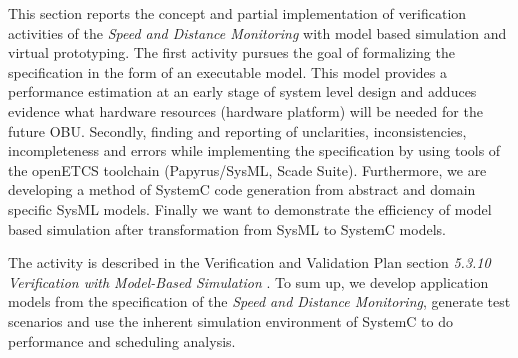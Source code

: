 %
%
%
%
%
%
%


\label{sec:urostock}
This section reports the concept and partial implementation of verification activities of the \emph{Speed and Distance Monitoring} with model based simulation and virtual prototyping. The first activity pursues the goal of formalizing the specification in the form of an executable model. This model provides a performance estimation at an early stage of system level design and adduces evidence what hardware resources (hardware platform) will be needed for the future OBU. Secondly, finding and reporting of unclarities, inconsistencies, incompleteness and errors while implementing the specification by using tools of the openETCS toolchain (Papyrus/SysML, Scade Suite). Furthermore, we are developing a method of SystemC code generation from abstract and domain specific SysML models. Finally we want to demonstrate the efficiency of model based simulation after transformation from SysML to SystemC models.

The activity is described in the Verification and Validation Plan section {\em 5.3.10 Verification with Model-Based Simulation} \cite{D4.1_2013}. To sum up, we develop application models from the specification of the \emph{Speed and Distance Monitoring}, generate test scenarios and use the inherent simulation environment of SystemC to do performance and scheduling analysis.

